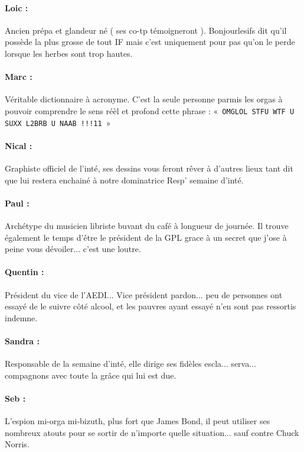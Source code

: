 \paragraph{Loic :} Ancien prépa et glandeur né ( ses co-tp témoigneront ). Bonjourlesifs dit qu'il possède la plus grosse de tout IF mais c'est uniquement pour pas qu'on le perde lorsque les herbes sont trop hautes.
\paragraph{Marc :} Véritable dictionnaire à acronyme. C'est la seule personne parmis les orgas à pouvoir comprendre le sens réèl et profond cette phrase : «~\texttt{OMGLOL STFU WTF U SUXX L2BRB U NAAB !!!11}~»
\paragraph{Nical :} Graphiste officiel de l'inté, ses dessins vous feront rêver à d'autres lieux tant dit que lui restera enchainé à notre dominatrice Resp' semaine d'inté.
\paragraph{Paul :} Archétype du musicien libriste buvant du café à longueur de journée. Il trouve également le temps d'être le président de la GPL grace à un secret que j'ose à peine vous dévoiler... c'est une loutre.
\paragraph{Quentin :} Président du vice de l'AEDI... Vice président pardon... peu de personnes ont essayé de le suivre côté alcool, et les pauvres ayant essayé n'en sont pas ressortis indemne.
\paragraph{Sandra :} Responsable de la semaine d'inté, elle dirige ses fidèles escla... serva... compagnons avec toute la grâce qui lui est due.
\vspace{0.5cm}
\paragraph{Seb :} L'espion mi-orga mi-bizuth, plus fort que James Bond, il peut utiliser ses nombreux atouts pour se sortir de n'importe quelle situation... sauf contre Chuck Norris.
\vfill
\columnbreak
{}
